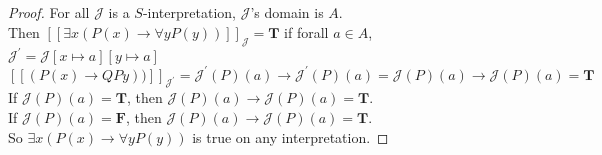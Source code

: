 \documentclass{article}
\begin{document}
\section{}
\begin{proof}
    For all $\mathcal{J}$ is a $S$-interpretation, $\mathcal{J}$'s domain is $A$.  \\
    Then 
    $ [\![\exists x (P(x) \rightarrow \forall y P(y))]\!]_\mathcal{J} = \mathbf{T}$ if forall $a \in A$, $\mathcal{J}^\prime = \mathcal{J}[x \mapsto a][y \mapsto a]$\\
    \[
        [\![(P(x) \rightarrow  QPy))]\!]_{\mathcal{J}^\prime} = \mathcal{J}^\prime(P)(a) \rightarrow \mathcal{J}^\prime(P)(a) = \mathcal{J}(P)(a) \rightarrow \mathcal{J}(P)(a) = \mathbf{T}
    \]
    If $\mathcal{J}(P)(a) = \mathbf{T}$, then $\mathcal{J}(P)(a) \rightarrow \mathcal{J}(P)(a) = \mathbf{T}$. \\
    If $\mathcal{J}(P)(a) = \mathbf{F}$, then $\mathcal{J}(P)(a) \rightarrow \mathcal{J}(P)(a) = \mathbf{T}$. \\
    So $\exists x (P(x) \rightarrow \forall y P(y))$ is true on any interpretation.
\end{proof}
\end{document}
